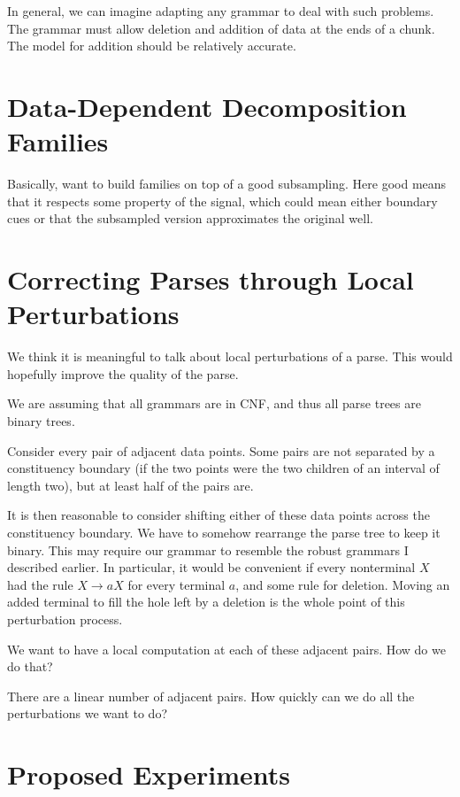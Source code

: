 \documentclass{article}
\begin{document}
In general, we can imagine adapting any grammar to deal with such
problems. The grammar must allow deletion and addition of data at the
ends of a chunk. The model for addition should be relatively accurate.

\section{Data-Dependent Decomposition Families}

Basically, want to build families on top of a good subsampling. Here
good means that it respects some property of the signal, which could
mean either boundary cues or that the subsampled version approximates
the original well.

\section{Correcting Parses through Local Perturbations}

We think it is meaningful to talk about local perturbations of a
parse. This would hopefully improve the quality of the parse.

We are assuming that all grammars are in CNF, and thus all parse trees
are binary trees.

Consider every pair of adjacent data points. Some pairs are not
separated by a constituency boundary (if the two points were the two
children of an interval of length two), but at least half of the pairs
are. 

It is then reasonable to consider shifting either of these data points
across the constituency boundary. We have to somehow rearrange the
parse tree to keep it binary. This may require our grammar to resemble
the robust grammars I described earlier. In particular, it would be
convenient if every nonterminal $X$ had the rule $X\to aX$ for every
terminal $a$, and some rule for deletion. Moving an added terminal to
fill the hole left by a deletion is the whole point of this
perturbation process.

We want to have a local computation at each of these adjacent
pairs. How do we do that?

There are a linear number of adjacent pairs. How quickly can we do all
the perturbations we want to do?

\section{Proposed Experiments}
\end{document}
